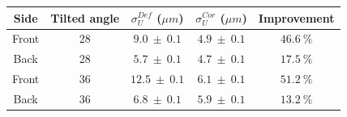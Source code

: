       \begin{table}[!h]
        \centering
        \begin{tabular}{c c c c c}
          \hline %
          Side &  Tilted angle  &   $\sigma_{U}^{Def}$ ($\mu m$) &   $\sigma_{U}^{Cor}$ ($\mu m$) & Improvement \\
          \hline %
          \hline %
          Front &      28       & $ 9.0 \ \pm \ 0.1 $ & $ 4.9 \ \pm \ 0.1 $ &    $46.6 \ \%$  \tabularnewline
          Back  &      28       & $ 5.7 \ \pm \ 0.1 $ & $ 4.7 \ \pm \ 0.1 $ &    $17.5 \ \%$  \tabularnewline
          \hline %
          Front &      36       & $ 12.5 \ \pm \ 0.1 $ & $ 6.1 \ \pm \ 0.1 $ &    $51.2 \ \%$ \tabularnewline
          Back  &      36       & $ 6.8 \ \pm \ 0.1 $ & $ 5.9 \ \pm \ 0.1 $ &    $13.2 \ \%$  \tabularnewline

\end{tabular}
\end{table}
